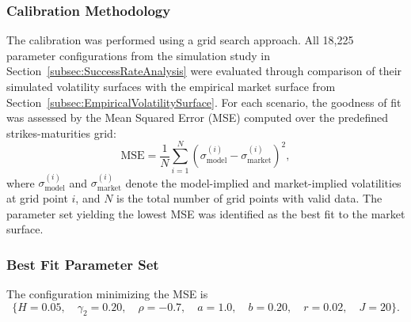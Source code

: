 \subsubsection*{Calibration Methodology}
The calibration was performed using a grid search approach. All 18{,}225 parameter configurations from the simulation study in Section~\ref{subsec:SuccessRateAnalysis} were evaluated through comparison of their simulated volatility surfaces with the empirical market surface from Section~\ref{subsec:EmpiricalVolatilitySurface}. For each scenario, the goodness of fit was assessed by the Mean Squared Error (MSE) computed over the predefined strikes-maturities grid:
\begin{equation}
    \text{MSE} = \frac{1}{N} \sum_{i=1}^{N} \left( \sigma_{\text{model}}^{(i)} - \sigma_{\text{market}}^{(i)} \right)^2,    
\end{equation}
where $\sigma_{\text{model}}^{(i)}$ and $\sigma_{\text{market}}^{(i)}$ denote the model-implied and market-implied volatilities at grid point $i$, and $N$ is the total number of grid points with valid data. The parameter set yielding the lowest MSE was identified as the best fit to the market surface.


\subsubsection*{Best Fit Parameter Set}
The configuration minimizing the MSE is
\begin{equation*}
    \{ H = 0.05,\quad \gamma_2 = 0.20,\quad \rho = -0.7,\quad a = 1.0,\quad b = 0.20,\quad r = 0.02,\quad J = 20 \}.
\end{equation*}

